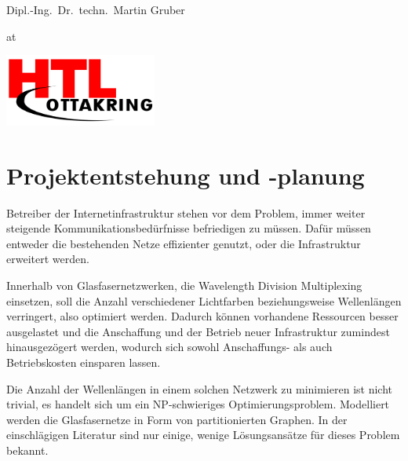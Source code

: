 \documentclass[paper=a4,fontsize=12pt]{scrartcl}
\begin{document}
\begin{titlepage}
\begin{center}
\vspace{5mm}

{\large Dipl.-Ing.\ Dr.\ techn.\ Martin Gruber}

\vspace{5mm}

at

\vspace{5mm}

\includegraphics[width=5cm]{../img/htl.png}

\vspace*{\fill}
\end{center}
\end{titlepage}
\tableofcontents
\newpage

\section{Projektentstehung und -planung}

Betreiber der Internetinfrastruktur stehen vor dem Problem, immer weiter steigende Kommunikationsbedürfnisse befriedigen zu müssen. Dafür müssen entweder die bestehenden Netze effizienter genutzt, oder die Infrastruktur erweitert werden.

Innerhalb von Glasfasernetzwerken, die Wavelength Division Multiplexing einsetzen, soll die Anzahl verschiedener Lichtfarben beziehungsweise Wellenlängen verringert, also optimiert werden. Dadurch können vorhandene Ressourcen besser ausgelastet und die Anschaffung und der Betrieb neuer Infrastruktur zumindest hinausgezögert werden, wodurch sich sowohl Anschaffungs- als auch Betriebskosten einsparen lassen.

Die Anzahl der Wellenlängen in einem solchen Netzwerk zu minimieren ist nicht trivial, es handelt sich um ein NP-schwieriges Optimierungsproblem. Modelliert werden die Glasfasernetze in Form von partitionierten Graphen. In der einschlägigen Literatur sind nur einige, wenige Lösungsansätze für dieses Problem bekannt. 
\end{document}
